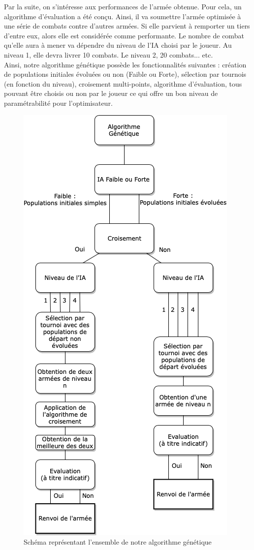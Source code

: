 \documentclass[a4paper]{article} %
\begin{document}
\label{OptiEval}Par la suite, on s'intéresse aux performances de l'armée obtenue. Pour cela, un algorithme d'évaluation a été conçu. Ainsi, il va soumettre l'armée optimisée à une série de combats contre d'autres armées. Si elle parvient à remporter un tiers d'entre eux, alors elle est considérée comme performante. Le nombre de combat qu'elle aura à mener va dépendre du niveau de l'IA choisi par le joueur. Au niveau 1, elle devra livrer 10 combats. Le niveau 2, 20 combats... etc.\\

Ainsi, notre algorithme génétique possède les fonctionnalités suivantes : création de populations initiales évoluées ou non (Faible ou Forte), sélection par tournois (en fonction du niveau), croisement multi-points, algorithme d'évaluation, tous pouvant être choisis ou non par le joueur ce qui offre un bon niveau de paramétrabilité pour l'optimisateur.

\begin{figure}[!h]
	\begin{center}
	\includegraphics[scale= 0.5]{Images/AlgorithmeGenetique.png}
	\caption{Schéma représentant l'ensemble de notre algorithme génétique}
	\end{center}
\end{figure}
\end{document}
